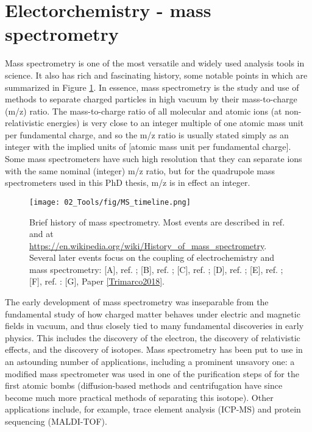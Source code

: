 \section{Electorchemistry - mass spectrometry}\label{sec:ECMS}

Mass spectrometry is one of the most versatile and widely used analysis tools in science\cite{Gross2007, Harris2010}. It also has rich and fascinating history\cite{Griffiths2008}, some notable points in which are summarized in Figure \ref{fig:MS_timeline}. In essence, mass spectrometry is the study and use of methods to separate charged particles in high vacuum by their mass-to-charge (m/z) ratio. The mass-to-charge ratio of  all molecular and atomic ions (at non-relativistic energies) is very close to an integer multiple of one atomic mass unit per fundamental charge, and so the m/z ratio is usually stated simply as an integer with the implied units of [atomic mass unit per fundamental charge]. Some mass spectrometers have such high resolution that they can separate ions with the same nominal (integer) m/z ratio\cite{Gross2007}, but for the quadrupole mass spectrometers used in this PhD thesis, m/z is in effect an integer.

\begin{figure}[p]
	\centering
	\texttt{[image: 02\_Tools/fig/MS\_timeline.png]}
	\caption{Brief history of mass spectrometry. Most events are described in ref.  and at \url{https://en.wikipedia.org/wiki/History_of_mass_spectrometry}. Several later events focus on the coupling of electrochemistry and mass spectrometry: [A], ref. ; [B], ref. ; [C], ref. ; [D], ref. ; [E], ref. ; [F], ref. : [G], Paper \ref{Trimarco2018}.}
	\label{fig:MS_timeline}
\end{figure}

The early development of mass spectrometry was inseparable from the fundamental study of how charged matter behaves under electric and magnetic fields in vacuum, and thus closely tied to many fundamental discoveries in early physics. This includes the discovery of the electron, the discovery of relativistic effects, and the discovery of isotopes. Mass spectrometry has been put to use in an astounding number of applications, including a prominent unsavory one: a modified mass spectrometer was used in one of the purification steps of  for the first atomic bombs (diffusion-based methods and centrifugation have since become much more practical methods of separating this isotope)\cite{Hewlett1962}. Other applications include, for example, trace element analysis (ICP-MS) and protein sequencing (MALDI-TOF).

